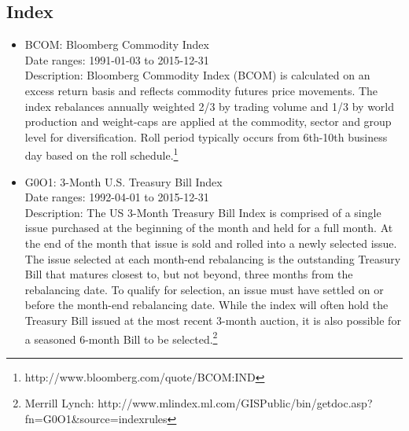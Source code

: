\documentclass[12pt]{article}
\begin{document}
\subsection{Index}

\begin{itemize}
\item BCOM: Bloomberg Commodity Index\\
Date ranges: 1991-01-03 to 2015-12-31\\
Description: Bloomberg Commodity Index (BCOM) is calculated on an excess return basis and reflects commodity futures price movements. The index rebalances annually weighted 2/3 by trading volume and 1/3 by world production and weight-caps are applied at the commodity, sector and group level for diversification. Roll period typically occurs from 6th-10th business day based on the roll schedule.\footnote{http://www.bloomberg.com/quote/BCOM:IND}
\item G0O1: 3-Month U.S. Treasury Bill Index\\
Date ranges: 1992-04-01 to 2015-12-31 \\
Description: The US 3-Month Treasury Bill Index is comprised of a single issue purchased at the beginning of the
month and held for a full month. At the end of the month that issue is sold and rolled into a newly selected issue. The
issue selected at each month-end rebalancing is the outstanding Treasury Bill that matures closest to, but not beyond, three
months from the rebalancing date. To qualify for selection, an issue must have settled on or before the month-end
rebalancing date. While the index will often hold the Treasury Bill issued at the most recent 3-month auction, it is also
possible for a seasoned 6-month Bill to be selected.\footnote{Merrill Lynch: http://www.mlindex.ml.com/GISPublic/bin/getdoc.asp?fn=G0O1\&source=indexrules}

\end{itemize}
\end{document}
